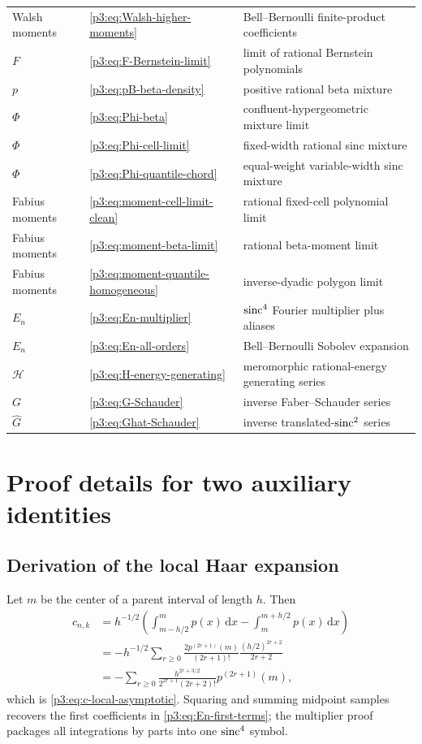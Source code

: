 \documentclass[11pt]{article}
\theoremstyle{definition}
\theoremstyle{remark}
\newcommand{\dd}{\,\mathrm d}
\begin{document}
\begin{longtable}{@{}p{}p{}p{}@{}}
Walsh moments & \eqref{p3:eq:Walsh-higher-moments} & Bell--Bernoulli finite-product coefficients\\
$F$ & \eqref{p3:eq:F-Bernstein-limit} & limit of rational Bernstein polynomials\\
$p$ & \eqref{p3:eq:pB-beta-density} & positive rational beta mixture\\
$\Phi$ & \eqref{p3:eq:Phi-beta} & confluent-hypergeometric mixture limit\\
$\Phi$ & \eqref{p3:eq:Phi-cell-limit} & fixed-width rational sinc mixture\\
$\Phi$ & \eqref{p3:eq:Phi-quantile-chord} & equal-weight variable-width sinc mixture\\
Fabius moments & \eqref{p3:eq:moment-cell-limit-clean} & rational fixed-cell polynomial limit\\
Fabius moments & \eqref{p3:eq:moment-beta-limit} & rational beta-moment limit\\
Fabius moments & \eqref{p3:eq:moment-quantile-homogeneous} & inverse-dyadic polygon limit\\
$E_n$ & \eqref{p3:eq:En-multiplier} & $\operatorname{sinc}^4$ Fourier multiplier plus aliases\\
$E_n$ & \eqref{p3:eq:En-all-orders} & Bell--Bernoulli Sobolev expansion\\
$\mathcal H$ & \eqref{p3:eq:H-energy-generating} & meromorphic rational-energy generating series\\
$G$ & \eqref{p3:eq:G-Schauder} & inverse Faber--Schauder series\\
$\widehat G$ & \eqref{p3:eq:Ghat-Schauder} & inverse translated-$\operatorname{sinc}^2$ series\\
\bottomrule
\end{longtable}

\section{Proof details for two auxiliary identities}
\label{p3:app:proof-details}

\subsection{Derivation of the local Haar expansion}

Let $m$ be the center of a parent interval of length $h$.  Then
\begin{align*}
 c_{n,k}
 &=h^{-1/2}\left(
   \int_{m-h/2}^{m}p(x)\dd x-
   \int_m^{m+h/2}p(x)\dd x\right)\\
 &=-h^{-1/2}\sum_{r\ge0}
   \frac{2p^{(2r+1)}(m)}{(2r+1)!}
   \frac{(h/2)^{2r+2}}{2r+2}\\
 &=-\sum_{r\ge0}
   \frac{h^{2r+3/2}}{2^{2r+1}(2r+2)!}p^{(2r+1)}(m),
\end{align*}
which is \eqref{p3:eq:c-local-asymptotic}.  Squaring and summing midpoint samples
recovers the first coefficients in \eqref{p3:eq:En-first-terms}; the multiplier
proof packages all integrations by parts into one $\operatorname{sinc}^4$ symbol.
\end{document}
